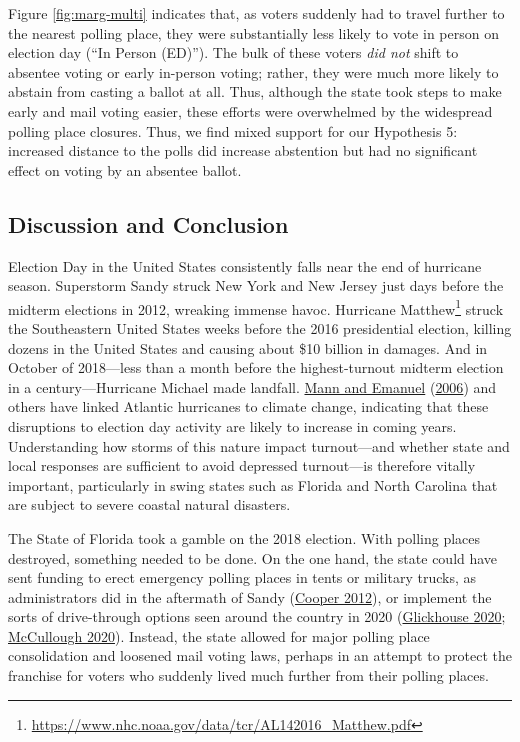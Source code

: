 \documentclass[
  12pt,
]{article}
\begin{document}
Figure \ref{fig:marg-multi} indicates that, as voters suddenly had to travel further to the nearest polling place, they were substantially less likely to vote in person on election day (``In Person (ED)''). The bulk of these voters \emph{did not} shift to absentee voting or early in-person voting; rather, they were much more likely to abstain from casting a ballot at all. Thus, although the state took steps to make early and mail voting easier, these efforts were overwhelmed by the widespread polling place closures. Thus, we find mixed support for our Hypothesis 5: increased distance to the polls did increase abstention but had no significant effect on voting by an absentee ballot.

\hypertarget{discussion-and-conclusion}{%
\subsection*{Discussion and Conclusion}\label{discussion-and-conclusion}}

Election Day in the United States consistently falls near the end of hurricane season. Superstorm Sandy struck New York and New Jersey just days before the midterm elections in 2012, wreaking immense havoc. Hurricane Matthew\footnote{\url{https://www.nhc.noaa.gov/data/tcr/AL142016_Matthew.pdf}} struck the Southeastern United States weeks before the 2016 presidential election, killing dozens in the United States and causing about \$10 billion in damages. And in October of 2018---less than a month before the highest-turnout midterm election in a century---Hurricane Michael made landfall. \protect\hyperlink{ref-Mann2006}{Mann and Emanuel} (\protect\hyperlink{ref-Mann2006}{2006}) and others have linked Atlantic hurricanes to climate change, indicating that these disruptions to election day activity are likely to increase in coming years. Understanding how storms of this nature impact turnout---and whether state and local responses are sufficient to avoid depressed turnout---is therefore vitally important, particularly in swing states such as Florida and North Carolina that are subject to severe coastal natural disasters.

The State of Florida took a gamble on the 2018 election. With polling places destroyed, something needed to be done. On the one hand, the state could have sent funding to erect emergency polling places in tents or military trucks, as administrators did in the aftermath of Sandy (\protect\hyperlink{ref-Cooper2012}{Cooper 2012}), or implement the sorts of drive-through options seen around the country in 2020 (\protect\hyperlink{ref-Glickhouse2020}{Glickhouse 2020}; \protect\hyperlink{ref-McCullough2020}{McCullough 2020}). Instead, the state allowed for major polling place consolidation and loosened mail voting laws, perhaps in an attempt to protect the franchise for voters who suddenly lived much further from their polling places.
\end{document}
